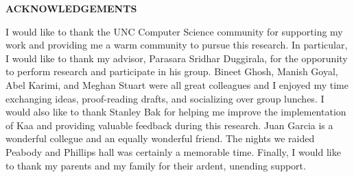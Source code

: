 
\begin{center}
\vspace*{52pt}
{\Large \textbf{ACKNOWLEDGEMENTS}}
\end{center}

I would like to thank the UNC Computer Science community for supporting my work and providing me a warm community to pursue this research. In particular, I would like to thank my advisor, Parasara Sridhar Duggirala, for the opporunity to perform research and participate in his group.
%
%
Bineet Ghosh, Manish Goyal, Abel Karimi, and Meghan Stuart were all great colleagues and I enjoyed my time exchanging ideas, proof-reading drafts, and socializing over group lunches. I would also like to thank Stanley Bak for helping me improve the implementation of Kaa and providing valuable feedback during this research. Juan Garcia is a wonderful collegue and an equally wonderful friend. The nights we raided Peabody and Phillips hall was certainly a memorable time. Finally, I would like to thank my parents and my family for their ardent, unending support.

\clearpage
